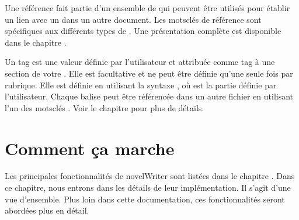\documentclass[a4paper,11pt,french]{sphinxmanual}
\begin{document}
\begin{description}
\sphinxAtStartPar
Une référence fait partie d’un ensemble de {\hyperref[\detokenize{int_glossary:term-Keyword}]{}} qui peuvent être utilisés pour établir un lien avec un {\hyperref[\detokenize{int_glossary:term-Tag}]{}} dans un autre document. Les mots\sphinxhyphen{}clés de référence sont spécifiques aux différents types de {\hyperref[\detokenize{int_glossary:term-Root-Folder}]{}}. Une présentation complète est disponible dans le chapitre {\hyperref[\detokenize{project_references:a-references}]{}}.

\sphinxAtStartPar
Un tag est une valeur définie par l’utilisateur et attribuée comme tag à une section de votre {\hyperref[\detokenize{int_glossary:term-Project-Notes}]{}}. Elle est facultative et ne peut être définie qu’une seule fois par rubrique. Elle est définie en utilisant la syntaxe {\hyperref[\detokenize{int_glossary:term-Keyword}]{}} , où  est la partie définie par l’utilisateur. Chaque balise peut être référencée dans un autre fichier en utilisant l’un des mots\sphinxhyphen{}clés {\hyperref[\detokenize{int_glossary:term-Reference}]{}}. Voir le chapitre {\hyperref[\detokenize{project_references:a-references}]{}} pour plus de détails.

\end{description}

\sphinxstepscope


\chapter{Comment ça marche}
\label{\detokenize{usage_breakdown:how-it-works}}\label{\detokenize{usage_breakdown:a-breakdown}}\label{\detokenize{usage_breakdown::doc}}
\sphinxAtStartPar
Les principales fonctionnalités de novelWriter sont listées dans le chapitre {\hyperref[\detokenize{int_introduction:a-intro}]{}}. Dans ce chapitre, nous entrons dans les détails de leur implémentation. Il s’agit d’une vue d’ensemble. Plus loin dans cette documentation, ces fonctionnalités seront abordées plus en détail.
\end{document}
